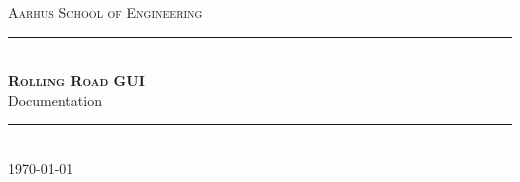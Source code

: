 \newcommand{\HRule}{\rule{\linewidth}{0.1mm}} %
\thispagestyle{empty}

\begin{center}
	
	\textsc{\LARGE Aarhus School of Engineering}\\[1.5cm] %
	
	\HRule \\[0.8cm]
	{\huge \bfseries \textsc{Rolling Road GUI}} \\[0.5cm]{\LARGE Documentation} \\[0.4cm]
	\HRule \\[1.5cm]
	
	\vfill
	\textsc{\large \today}\\
	
\end{center} %

\newpage